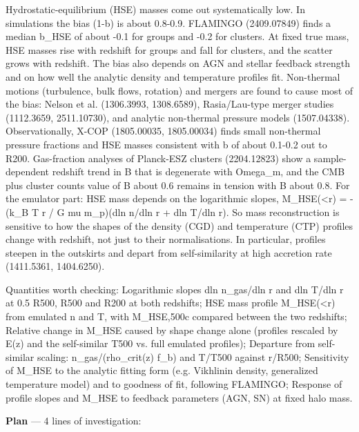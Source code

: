\documentclass[11pt,a4paper]{article}
\begin{document}
Hydrostatic-equilibrium (HSE) masses come out systematically low. In simulations the bias (1-b) is about 0.8-0.9. FLAMINGO (2409.07849) finds a median b\_HSE of about -0.1 for groups and -0.2 for clusters. At fixed true mass, HSE masses rise with redshift for groups and fall for clusters, and the scatter grows with redshift. The bias also depends on AGN and stellar feedback strength and on how well the analytic density and temperature profiles fit. Non-thermal motions (turbulence, bulk flows, rotation) and mergers are found to cause most of the bias: Nelson et al. (1306.3993, 1308.6589), Rasia/Lau-type merger studies (1112.3659, 2511.10730), and analytic non-thermal pressure models (1507.04338). Observationally, X-COP (1805.00035, 1805.00034) finds small non-thermal pressure fractions and HSE masses consistent with b of about 0.1-0.2 out to R200. Gas-fraction analyses of Planck-ESZ clusters (2204.12823) show a sample-dependent redshift trend in B that is degenerate with Omega\_m, and the CMB plus cluster counts value of B about 0.6 remains in tension with B about 0.8. For the emulator part: HSE mass depends on the logarithmic slopes, M\_HSE(\textless{}r) = -(k\_B T r / G mu m\_p)(dln n/dln r + dln T/dln r). So mass reconstruction is sensitive to how the shapes of the density (CGD) and temperature (CTP) profiles change with redshift, not just to their normalisations. In particular, profiles steepen in the outskirts and depart from self-similarity at high accretion rate (1411.5361, 1404.6250).

Quantities worth checking: Logarithmic slopes dln n\_gas/dln r and dln T/dln r at 0.5 R500, R500 and R200 at both redshifts; HSE mass profile M\_HSE(\textless{}r) from emulated n and T, with M\_HSE,500c compared between the two redshifts; Relative change in M\_HSE caused by shape change alone (profiles rescaled by E(z) and the self-similar T500 vs. full emulated profiles); Departure from self-similar scaling: n\_gas/(rho\_crit(z) f\_b) and T/T500 against r/R500; Sensitivity of M\_HSE to the analytic fitting form (e.g. Vikhlinin density, generalized temperature model) and to goodness of fit, following FLAMINGO; Response of profile slopes and M\_HSE to feedback parameters (AGN, SN) at fixed halo mass.

\textbf{Plan} --- 4 lines of investigation:
\end{document}
